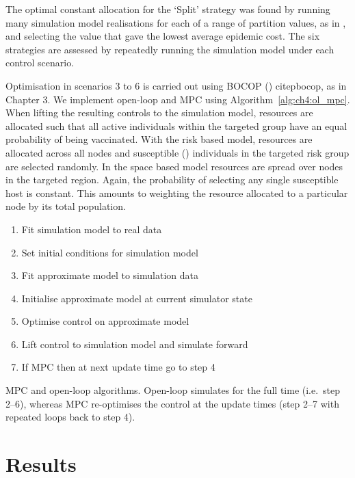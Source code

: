 The optimal constant allocation for the `Split' strategy was found by running many simulation model realisations for each of a range of partition values, as in \cite{cunniffe_optimising_2015}, and selecting the value that gave the lowest average epidemic cost. The six strategies are assessed by repeatedly running the simulation model under each control scenario.

Optimisation in scenarios 3 to 6 is carried out using BOCOP () citep{bocop}, as in Chapter 3. We implement open-loop and MPC using Algorithm~\ref{alg:ch4:ol_mpc}. When lifting the resulting controls to the simulation model, resources are allocated such that all active individuals within the targeted group have an equal probability of being vaccinated. With the risk based model, resources are allocated across all nodes and susceptible () individuals in the targeted risk group are selected randomly. In the space based model resources are spread over nodes in the targeted region. Again, the probability of selecting any single susceptible host is constant. This amounts to weighting the resource allocated to a particular node by its total population.
 
\begin{algorithm}[H]
    \begin{enumerate}
        \item{}Fit simulation model to real data
        \item{}Set initial conditions for simulation model
        \item{}Fit approximate model to simulation data
        \item{}Initialise approximate model at current simulator state
        \item{}Optimise control on approximate model
        \item{}Lift control to simulation model and simulate forward
        \item{}If MPC then at next update time go to step 4
    \end{enumerate}
\caption{MPC and open-loop algorithms. Open-loop simulates for the full time (i.e.\ step 2--6), whereas MPC re-optimises the control at the update times (step 2--7 with repeated loops back to step 4).\label{alg:ch4:ol_mpc}}
\end{algorithm}

\FloatBarrier

\section{Results\label{sec:ch4:Results}}

